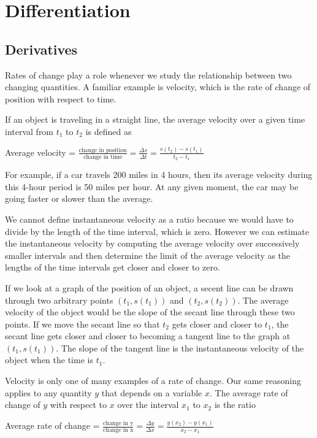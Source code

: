 \documentclass[../bccalc.tex]{subfiles}
\begin{document}
\chapter{Differentiation}
\section{Derivatives}
Rates of change play a role whenever we study the relationship between two changing quantities. A familiar example is velocity, which is the rate of change of position with respect to time.

If an object is traveling in a straight line, the average velocity over a given time interval from $t_1$ to $t_2$ is defined as 
\begin{center}
    Average velocity = $\frac{\text{change in position}}{\text{change in time}} = \frac{\Delta s}{\Delta t} = \frac{s(t_2)-s(t_1)}{t_2-t_1}$
\end{center}

For example, if a car travels 200 miles in 4 hours, then its average velocity during this 4-hour period is 50 miles per hour. At any given moment, the car may be going faster or slower than the average.

We cannot define instantaneous velocity as a ratio because we would have to divide by the length of the time interval, which is zero. However we can estimate the instantaneous velocity by computing the average velocity over successively smaller intervals and then determine the limit of the average velocity 
as the lengths of the time intervals get closer and closer to zero.

If we look at a graph of the position of an object, a secent line can be drawn through two arbitrary points $(t_1,s(t_1))$ and $(t_2,s(t_2))$. The average velocity of the object would be 
the slope of the secant line through these two points. If we move the secant line so that $t_2$ gets closer and closer to $t_1$, the secant line gets closer and closer to becoming a tangent line to the graph at $(t_1,s(t_1))$. The slope of the tangent line is the instantaneous velocity of the object when the time is $t_1$.

Velocity is only one of many examples of a rate of change. Our same reasoning applies to any quantity $y$ that depends on a variable $x$. The average rate of change of $y$ with respect to $x$ over the interval $x_1$ to $x_2$ is the ratio 
\begin{center}
    Average rate of change = $\frac{\text{change in y}}{\text{change in x}} = \frac{\Delta y}{\Delta x} = \frac{y(x_2)-y(x_1)}{x_2-x_1}$
\end{center}
\end{document}

